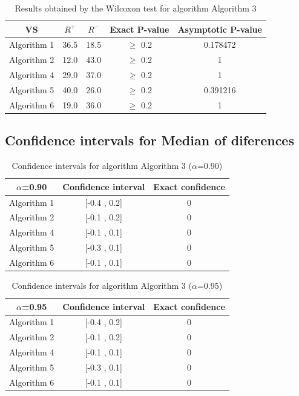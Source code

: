 \documentclass[a4paper,10pt]{article}
\begin{document}
\begin{table}[!htp]
\centering\small
\begin{tabular}{
|c|c|c|c|c|}
\hline
 VS & $R^{+}$ & $R^{-}$ & Exact P-value & Asymptotic P-value \\ \hline 
Algorithm 1 & 36.5 & 18.5 & $\geq$ 0.2 & 0.178472\\ \hline 
Algorithm 2 & 12.0 & 43.0 & $\geq$ 0.2 & 1\\ \hline 
Algorithm 4 & 29.0 & 37.0 & $\geq$ 0.2 & 1\\ \hline 
Algorithm 5 & 40.0 & 26.0 & $\geq$ 0.2 & 0.391216\\ \hline 
Algorithm 6 & 19.0 & 36.0 & $\geq$ 0.2 & 1\\ \hline 

\end{tabular}
\caption{Results obtained by the Wilcoxon test for algorithm Algorithm 3}
\end{table}

\subsection{Confidence intervals for Median of diferences}

\begin{table}[!htp]
\centering\small
\begin{tabular}{
|c|c|c|}
\hline
 $\alpha$=0.90 & Confidence interval & Exact confidence \\ \hline 
Algorithm 1 & [-0.4 , 0.2] & 0\\ \hline 
Algorithm 2 & [-0.1 , 0.2] & 0\\ \hline 
Algorithm 4 & [-0.1 , 0.1] & 0\\ \hline 
Algorithm 5 & [-0.3 , 0.1] & 0\\ \hline 
Algorithm 6 & [-0.1 , 0.1] & 0\\ \hline 

\end{tabular}
\caption{Confidence intervals for algorithm Algorithm 3 ($\alpha$=0.90)}
\end{table}
\begin{table}[!htp]
\centering\small
\begin{tabular}{
|c|c|c|}
\hline
 $\alpha$=0.95 & Confidence interval & Exact confidence \\ \hline 
Algorithm 1 & [-0.4 , 0.2] & 0\\ \hline 
Algorithm 2 & [-0.1 , 0.2] & 0\\ \hline 
Algorithm 4 & [-0.1 , 0.1] & 0\\ \hline 
Algorithm 5 & [-0.3 , 0.1] & 0\\ \hline 
Algorithm 6 & [-0.1 , 0.1] & 0\\ \hline 

\end{tabular}
\caption{Confidence intervals for algorithm Algorithm 3 ($\alpha$=0.95)}
\end{table}
\end{document}
